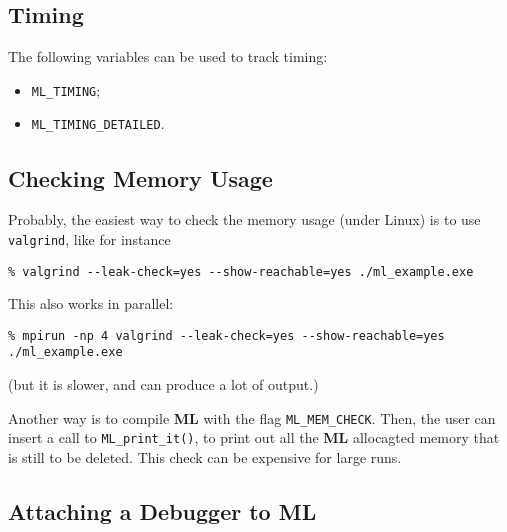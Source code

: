 \documentclass[10pt,letter,relax]{SANDreport}
\newcommand{\ML}     {{\bf ML }}
\begin{document}
\subsection{Timing}

The following variables can be used to track timing:
\begin{itemize}
\item \verb!ML_TIMING!;
\item \verb!ML_TIMING_DETAILED!.
\end{itemize}

\subsection{Checking Memory Usage}

Probably, the easiest way to check the memory usage (under Linux) is to use
\verb!valgrind!, like for instance
\begin{verbatim}
% valgrind --leak-check=yes --show-reachable=yes ./ml_example.exe
\end{verbatim}
This also works in parallel:
\begin{verbatim}
% mpirun -np 4 valgrind --leak-check=yes --show-reachable=yes ./ml_example.exe
\end{verbatim}
(but it is slower, and can produce a lot of output.)

Another way is to compile \ML with the flag \verb!ML_MEM_CHECK!. Then,
the user can insert a call to \verb!ML_print_it()!, to print out all the
\ML allocagted memory that is still to be deleted. This check can be
expensive for large runs.

\subsection{Attaching a Debugger to ML}
\end{document}
